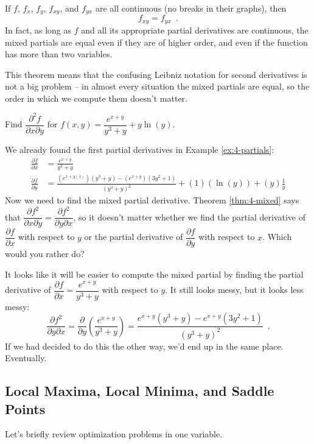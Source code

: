\begin{theorem}
  \label{thm:4-mixed}
If $f$, $f_x$, $f_y$, $f_{xy}$, and $f_{yx}$ are all continuous (no breaks in their graphs), then
$$f_{xy}=f_{yx} \enspace .$$
In fact, as long as $f$ and all its appropriate partial derivatives are continuous, the mixed partials are equal even if they are of higher order, and even if the function has more than two variables.
\end{theorem}
This theorem means that the confusing Leibniz notation for second derivatives is not a big problem -- in almost every situation the mixed partials are equal, so the order in which we compute them doesn't matter.

\begin{example}
Find $\dfrac{\partial^2 f}{\partial x\partial y}$ for $f(x,y)=\dfrac{e^{x+y}}{y^3+y}+y\ln(y)$.

\begin{solution}
  We already found the first partial derivatives in Example \ref{ex:4-partials}:
  \begin{align*}
\frac{\partial f}{\partial x} &= \frac{e^{x+y}}{y^3+y} \\
\frac{\partial f}{\partial y} &= \frac{(e^{x+y(1)})(y^3+y)-(e^{x+y})(3y^2+1)}{(y^3+y)^2}+(1)(\ln(y))+(y)\frac{1}{y}
\end{align*}
Now we need to find the mixed partial derivative. Theorem \ref{thm:4-mixed} says that $\dfrac{\partial f^2}{\partial x\partial y} = \dfrac{\partial f^2}{\partial y\partial x}$, so it doesn't matter whether we find the partial derivative of $\dfrac{\partial f}{\partial x}$ with respect to $y$ or the partial derivative of $\dfrac{\partial f}{\partial y}$ with respect to $x$. Which would you rather do?

It looks like it will be easier to compute the mixed partial by finding the partial derivative of $\dfrac{\partial f}{\partial x} = \dfrac{e^{x+y}}{y^3+y}$ with respect to $y$. It still looks messy, but it looks less messy:
$$\frac{\partial f^2}{\partial y\partial x}=\frac{\partial}{\partial y}\left(\frac{e^{x+y}}{y^3+y}\right) = \frac{e^{x+y}(y^3+y)-e^{x+y}(3y^2+1)}{(y^3+y)^2} \enspace .$$
If we had decided to do this the other way, we'd end up in the same place. Eventually.
\end{solution}\end{example}

\subsection{Local Maxima, Local Minima, and Saddle Points}
Let's briefly review optimization problems in one variable.

